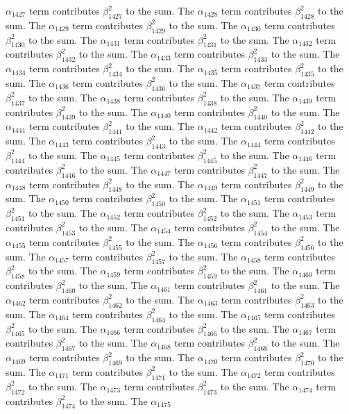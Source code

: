 \begin{lemma}
$\alpha_{1427}$ term contributes $\beta_{1427}^{2}$ to the sum. The $\alpha_{1428}$ term contributes $\beta_{1428}^{2}$ to the sum. The $\alpha_{1429}$ term contributes $\beta_{1429}^{2}$ to the sum. The $\alpha_{1430}$ term contributes $\beta_{1430}^{2}$ to the sum. The $\alpha_{1431}$ term contributes $\beta_{1431}^{2}$ to the sum. The $\alpha_{1432}$ term contributes $\beta_{1432}^{2}$ to the sum. The $\alpha_{1433}$ term contributes $\beta_{1433}^{2}$ to the sum. The $\alpha_{1434}$ term contributes $\beta_{1434}^{2}$ to the sum. The $\alpha_{1435}$ term contributes $\beta_{1435}^{2}$ to the sum. The $\alpha_{1436}$ term contributes $\beta_{1436}^{2}$ to the sum. The $\alpha_{1437}$ term contributes $\beta_{1437}^{2}$ to the sum. The $\alpha_{1438}$ term contributes $\beta_{1438}^{2}$ to the sum. The $\alpha_{1439}$ term contributes $\beta_{1439}^{2}$ to the sum. The $\alpha_{1440}$ term contributes $\beta_{1440}^{2}$ to the sum. The $\alpha_{1441}$ term contributes $\beta_{1441}^{2}$ to the sum. The $\alpha_{1442}$ term contributes $\beta_{1442}^{2}$ to the sum. The $\alpha_{1443}$ term contributes $\beta_{1443}^{2}$ to the sum. The $\alpha_{1444}$ term contributes $\beta_{1444}^{2}$ to the sum. The $\alpha_{1445}$ term contributes $\beta_{1445}^{2}$ to the sum. The $\alpha_{1446}$ term contributes $\beta_{1446}^{2}$ to the sum. The $\alpha_{1447}$ term contributes $\beta_{1447}^{2}$ to the sum. The $\alpha_{1448}$ term contributes $\beta_{1448}^{2}$ to the sum. The $\alpha_{1449}$ term contributes $\beta_{1449}^{2}$ to the sum. The $\alpha_{1450}$ term contributes $\beta_{1450}^{2}$ to the sum. The $\alpha_{1451}$ term contributes $\beta_{1451}^{2}$ to the sum. The $\alpha_{1452}$ term contributes $\beta_{1452}^{2}$ to the sum. The $\alpha_{1453}$ term contributes $\beta_{1453}^{2}$ to the sum. The $\alpha_{1454}$ term contributes $\beta_{1454}^{2}$ to the sum. The $\alpha_{1455}$ term contributes $\beta_{1455}^{2}$ to the sum. The $\alpha_{1456}$ term contributes $\beta_{1456}^{2}$ to the sum. The $\alpha_{1457}$ term contributes $\beta_{1457}^{2}$ to the sum. The $\alpha_{1458}$ term contributes $\beta_{1458}^{2}$ to the sum. The $\alpha_{1459}$ term contributes $\beta_{1459}^{2}$ to the sum. The $\alpha_{1460}$ term contributes $\beta_{1460}^{2}$ to the sum. The $\alpha_{1461}$ term contributes $\beta_{1461}^{2}$ to the sum. The $\alpha_{1462}$ term contributes $\beta_{1462}^{2}$ to the sum. The $\alpha_{1463}$ term contributes $\beta_{1463}^{2}$ to the sum. The $\alpha_{1464}$ term contributes $\beta_{1464}^{2}$ to the sum. The $\alpha_{1465}$ term contributes $\beta_{1465}^{2}$ to the sum. The $\alpha_{1466}$ term contributes $\beta_{1466}^{2}$ to the sum. The $\alpha_{1467}$ term contributes $\beta_{1467}^{2}$ to the sum. The $\alpha_{1468}$ term contributes $\beta_{1468}^{2}$ to the sum. The $\alpha_{1469}$ term contributes $\beta_{1469}^{2}$ to the sum. The $\alpha_{1470}$ term contributes $\beta_{1470}^{2}$ to the sum. The $\alpha_{1471}$ term contributes $\beta_{1471}^{2}$ to the sum. The $\alpha_{1472}$ term contributes $\beta_{1472}^{2}$ to the sum. The $\alpha_{1473}$ term contributes $\beta_{1473}^{2}$ to the sum. The $\alpha_{1474}$ term contributes $\beta_{1474}^{2}$ to the sum. The $\alpha_{1475}$ 
\end{lemma}
